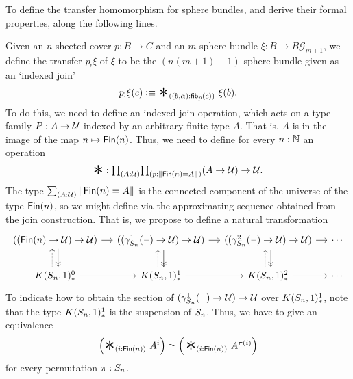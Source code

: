 \documentclass[reqno]{amsart}
\begin{document}
\begin{proposal}\label{p:transfer_sphere_bundle}
To define the transfer homomorphism for sphere bundles, and derive their formal
properties, along the following lines.

Given an $n$-sheeted cover $p:B\to C$ and an $m$-sphere bundle $\xi:B\to B\mathcal{G}_{m+1}$,
we define the transfer $p_!\xi$ of $\xi$ to be the $(n(m+1)-1)$-sphere bundle given 
as an `indexed join'
\begin{equation*}
p_!\xi(c)\defeq \bigjoin{\pairr{b,\alpha}:\fib{p}{c}}\xi(b).
\end{equation*}
To do this, we need to define an indexed join operation, which acts on a type
family $P:A\to \mathcal{U}$ indexed by an arbitrary finite type $A$. That is, $A$ is in
the image of the map $n\mapsto\mathsf{Fin}(n)$. 
Thus, we need to define for every $n:\mathbb{N}$ an operation
\begin{equation*}
\bigjoinsym : \prd{A:\UU}{p:\brck{\finset{n}=A}}(A\to\UU)\to\UU.
\end{equation*}
The type $\sm{A:\UU}\brck{\finset{n}=A}$ is the connected component of the universe
of the type $\mathsf{Fin}(n)$, so we might define via the approximating sequence obtained
from the join construction. That is, we propose to define a natural transformation
\begin{equation*}
\begin{tikzcd}[column sep=small]
((\finset{n}\to\UU)\to\UU) \arrow[r] \arrow[d,xshift=.7ex,->>] & ((\gamma_{\symmetric{n}}^1(\blank)\to\UU)\to\UU) \arrow[d,xshift=.7ex,->>] \arrow[r] & ((\gamma_{\symmetric{n}}^2(\blank)\to\UU)\to\UU) \arrow[d,xshift=.7ex,->>] \arrow[r] & \cdots \\
K(\symmetric{n},1)^0_\ast \arrow[r] \arrow[u,xshift=-.7ex,densely dotted] & K(\symmetric{n},1)^1_\ast \arrow[r] \arrow[u,xshift=-.7ex,densely dotted] & K(\symmetric{n},1)^2_\ast \arrow[r] \arrow[u,xshift=-.7ex,densely dotted] & \cdots
\end{tikzcd}
\end{equation*}
To indicate how to obtain the section of $(\gamma_{S_{n}}^1(\mathord{\hspace{1pt}\text{--}\hspace{1pt}})\to\mathcal{U})\to\mathcal{U}$ over $K(S_{n},1)^1_\ast$, note that the type $K(S_{n},1)^1_\ast$ is the suspension of $S_{n}$. Thus, we have to give an equivalence
\begin{equation*}
\eqv{\Big(\bigjoin{i:\finset{n}}{A^i}\Big)}{\Big(\bigjoin{i:\finset{n}}{A^{\pi(i)}}\Big)}
\end{equation*}
for every permutation $\pi:S_{n}$. 
\end{proposal}
\end{document}
